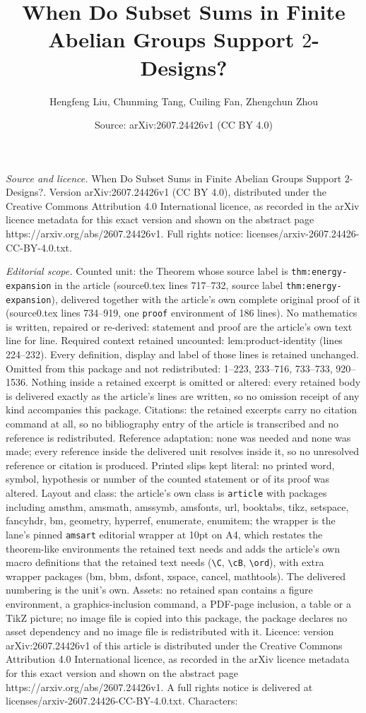\documentclass[10pt,a4paper]{amsart}
\title[When Do Subset Sums in Finite Abelian Groups Support $2$-Des]{When Do Subset Sums in Finite Abelian Groups Support $2$-Designs?}
\author{Hengfeng Liu, Chunming Tang, Cuiling Fan, Zhengchun Zhou}
\date{Source: arXiv:2607.24426v1 (CC BY 4.0)}
\begin{document}
\maketitle

\noindent\emph{Source and licence.} When Do Subset Sums in Finite Abelian Groups Support $2$-Designs?. Version arXiv:2607.24426v1 (CC BY 4.0), distributed under the Creative Commons Attribution 4.0 International licence, as recorded in the arXiv licence metadata for this exact version and shown on the abstract page https://arxiv.org/abs/2607.24426v1. Full rights notice: licenses/arxiv-2607.24426-CC-BY-4.0.txt.\par\smallskip

\noindent\textit{Editorial scope.} Counted unit: the Theorem whose source label is \texttt{thm:energy-expansion} in the article (source0.tex lines 717--732, source label \texttt{thm:energy-expansion}), delivered together with the article's own complete original proof of it (source0.tex lines 734--919, one \texttt{proof} environment of 186 lines). No mathematics is written, repaired or re-derived: statement and proof are the article's own text line for line. Required context retained uncounted: lem:product-identity (lines 224--232). Every definition, display and label of those lines is retained unchanged. Omitted from this package and not redistributed: 1--223, 233--716, 733--733, 920--1536. Nothing inside a retained excerpt is omitted or altered: every retained body is delivered exactly as the article's lines are written, so no omission receipt of any kind accompanies this package. Citations: the retained excerpts carry no citation command at all, so no bibliography entry of the article is transcribed and no reference is redistributed. Reference adaptation: none was needed and none was made; every reference inside the delivered unit resolves inside it, so no unresolved reference or citation is produced. Printed slips kept literal: no printed word, symbol, hypothesis or number of the counted statement or of its proof was altered. Layout and class: the article's own class is \texttt{article} with packages including amsthm, amsmath, amssymb, amsfonts, url, booktabs, tikz, setspace, fancyhdr, bm, geometry, hyperref, enumerate, enumitem; the wrapper is the lane's pinned \texttt{amsart} editorial wrapper at 10pt on A4, which restates the theorem-like environments the retained text needs and adds the article's own macro definitions that the retained text needs (\texttt{\textbackslash C}, \texttt{\textbackslash cB}, \texttt{\textbackslash ord}), with extra wrapper packages (bm, bbm, dsfont, xspace, cancel, mathtools). The delivered numbering is the unit's own. Assets: no retained span contains a figure environment, a graphics-inclusion command, a PDF-page inclusion, a table or a TikZ picture; no image file is copied into this package, the package declares no asset dependency and no image file is redistributed with it. Licence: version arXiv:2607.24426v1 of this article is distributed under the Creative Commons Attribution 4.0 International licence, as recorded in the arXiv licence metadata for this exact version and shown on the abstract page https://arxiv.org/abs/2607.24426v1. A full rights notice is delivered at licenses/arxiv-2607.24426-CC-BY-4.0.txt. Characters: 
\end{document}
